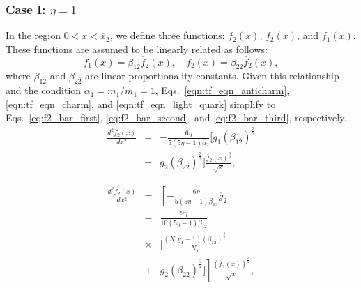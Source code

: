 \documentclass[final,3p,times,twocolumn]{elsarticle}
\begin{document}
        \subsubsection{Case I: $\eta =1$}        
            In the region $0 < x < \overline{x}_{2}$, we define three functions: $f_2(x)$, $\overline{f}_{2}(x)$, and $f_1(x)$. These functions are assumed to be linearly related as follows:  
            \[
            f_1(x) = \beta_{1\overline{2}} \overline{f}_{2}(x), \quad f_2(x) = \beta_{2\overline{2}} \overline{f}_{2}(x),
            \]
            where $\beta_{1\overline{2}}$ and $\beta_{2\overline{2}}$ are linear proportionality constants. 
            Given this relationship and the condition $\alpha_1 = m_{1}/m_{1} = 1$, Eqs.~\eqref{eqn:tf_eqn_anticharm}, \eqref{eqn:tf_eqn_charm}, and \eqref{eqn:tf_eqn_light_quark} simplify to Eqs.~\eqref{eq:f2_bar_first}, \eqref{eq:f2_bar_second}, and \eqref{eq:f2_bar_third}, respectively.
            \begin{eqnarray}
                   \frac{d^2\overline{f}_{2}(x)}{dx^2} &=& -\frac{6\eta}{5(5\eta-1) \overline{\alpha}_2} \biggl[ g_1 (\beta_{1\overline{2}})^\frac{3}{2} \nonumber \\
                   &+& g_2 (\beta_{2\overline{2}})^\frac{3}{2}
                    \biggr] \frac{\overline{f}_{2}(x)^\frac{3}{2}}{\sqrt{x}},
                    \label{eq:f2_bar_first}
            \end{eqnarray}
            
            \begin{eqnarray}
                  \frac{d^2 \overline{f}_{2}(x)}{dx^2} &=& \left[- \frac{6 \eta}{5 (5 \eta -1) \beta_{1\overline{2}}}\overline{g}_{2} \right. \nonumber \\
                  &-&\frac{9\eta}{10(5\eta-1)\beta_{1\overline{2}}} \nonumber \\
                  &\times& \biggl[\frac{(N_1 g_1-1)(\beta_{1\overline{2}})^\frac{3}{2}}{N_1} \nonumber \\
                 &+& \left. g_2 (\beta_{2\overline{2}})^\frac{3}{2} \biggr]\right]
                 \frac{\left( \overline{f}_2(x)\right)^\frac{3}{2}}{\sqrt{x}},
                 \label{eq:f2_bar_second}
            \end{eqnarray}
            
\end{document}
